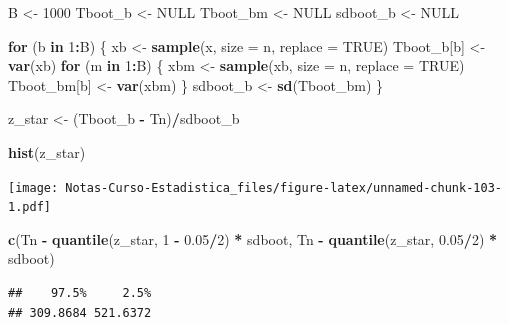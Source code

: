 \documentclass[
  12pt,
]{book}
\newenvironment{Shaded}{\begin{snugshade}}{\end{snugshade}}
\newcommand{\ControlFlowTok}[1]{\textcolor[rgb]{0.13,0.29,0.53}{\textbf{#1}}}
\newcommand{\DataTypeTok}[1]{\textcolor[rgb]{0.13,0.29,0.53}{#1}}
\newcommand{\DecValTok}[1]{\textcolor[rgb]{0.00,0.00,0.81}{#1}}
\newcommand{\FloatTok}[1]{\textcolor[rgb]{0.00,0.00,0.81}{#1}}
\newcommand{\KeywordTok}[1]{\textcolor[rgb]{0.13,0.29,0.53}{\textbf{#1}}}
\newcommand{\NormalTok}[1]{#1}
\newcommand{\OperatorTok}[1]{\textcolor[rgb]{0.81,0.36,0.00}{\textbf{#1}}}
\newcommand{\OtherTok}[1]{\textcolor[rgb]{0.56,0.35,0.01}{#1}}
\newcommand{\StringTok}[1]{\textcolor[rgb]{0.31,0.60,0.02}{#1}}
\theoremstyle{definition}
\theoremstyle{definition}
\theoremstyle{definition}
\theoremstyle{remark}
\begin{document}
\begin{Shaded}
\begin{Highlighting}[]
\NormalTok{B <-}\StringTok{ }\DecValTok{1000}
\NormalTok{Tboot_b <-}\StringTok{ }\OtherTok{NULL}
\NormalTok{Tboot_bm <-}\StringTok{ }\OtherTok{NULL}
\NormalTok{sdboot_b <-}\StringTok{ }\OtherTok{NULL}

\ControlFlowTok{for}\NormalTok{ (b }\ControlFlowTok{in} \DecValTok{1}\OperatorTok{:}\NormalTok{B) \{}
\NormalTok{    xb <-}\StringTok{ }\KeywordTok{sample}\NormalTok{(x, }\DataTypeTok{size =}\NormalTok{ n, }\DataTypeTok{replace =} \OtherTok{TRUE}\NormalTok{)}
\NormalTok{    Tboot_b[b] <-}\StringTok{ }\KeywordTok{var}\NormalTok{(xb)}
    \ControlFlowTok{for}\NormalTok{ (m }\ControlFlowTok{in} \DecValTok{1}\OperatorTok{:}\NormalTok{B) \{}
\NormalTok{        xbm <-}\StringTok{ }\KeywordTok{sample}\NormalTok{(xb, }\DataTypeTok{size =}\NormalTok{ n, }\DataTypeTok{replace =} \OtherTok{TRUE}\NormalTok{)}
\NormalTok{        Tboot_bm[b] <-}\StringTok{ }\KeywordTok{var}\NormalTok{(xbm)}
\NormalTok{    \}}
\NormalTok{    sdboot_b <-}\StringTok{ }\KeywordTok{sd}\NormalTok{(Tboot_bm)}
\NormalTok{\}}

\NormalTok{z_star <-}\StringTok{ }\NormalTok{(Tboot_b }\OperatorTok{-}\StringTok{ }\NormalTok{Tn)}\OperatorTok{/}\NormalTok{sdboot_b}

\KeywordTok{hist}\NormalTok{(z_star)}
\end{Highlighting}
\end{Shaded}

\texttt{[image: Notas-Curso-Estadistica\_files/figure-latex/unnamed-chunk-103-1.pdf]}

\begin{Shaded}
\begin{Highlighting}[]
\KeywordTok{c}\NormalTok{(Tn }\OperatorTok{-}\StringTok{ }\KeywordTok{quantile}\NormalTok{(z_star, }\DecValTok{1} \OperatorTok{-}\StringTok{ }\FloatTok{0.05}\OperatorTok{/}\DecValTok{2}\NormalTok{) }\OperatorTok{*}\StringTok{ }\NormalTok{sdboot, Tn }\OperatorTok{-}\StringTok{ }
\StringTok{    }\KeywordTok{quantile}\NormalTok{(z_star, }\FloatTok{0.05}\OperatorTok{/}\DecValTok{2}\NormalTok{) }\OperatorTok{*}\StringTok{ }\NormalTok{sdboot)}
\end{Highlighting}
\end{Shaded}

\begin{verbatim}
##    97.5%     2.5% 
## 309.8684 521.6372
\end{verbatim}
\end{document}
